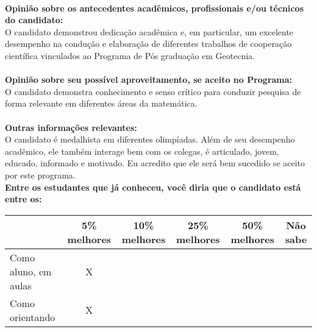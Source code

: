\documentclass[11pt]{article}
\begin{document}
\\
\textbf{Opinião sobre os antecedentes acadêmicos, profissionais e/ou técnicos do candidato:}
\\O candidato demonstrou dedicação acadêmica e, em particular, um excelente desempenho na condução e elaboração de diferentes trabalhos de cooperação científica vinculados ao Programa de Pós graduação em Geotecnia. \\
\\
\textbf{Opinião sobre seu possível aproveitamento, se aceito no Programa:}
\\O candidato demonstra conhecimento e senso crítico para conduzir pesquisa de forma relevante em diferentes áreas da matemática.\\ 
\\
\textbf{Outras informações relevantes:} \\O candidato é medalhista em diferentes olimpíadas. Além de seu desempenho acadêmico, ele também interage bem com os colegas, é articulado, jovem, educado, informado e motivado. Eu acredito que ele será bem sucedido se aceito por este programa.
\\[0.3cm]
\textbf{Entre os estudantes que já conheceu, você diria que o candidato está entre os:}
\\
\begin{tabular}{|l|c|c|c|c|c|}
\hline
 & 5\% melhores & 10\% melhores & 25\% melhores & 50\% melhores & Não sabe \\
\hline
Como aluno, em aulas & X &  &  &  & \\
\hline
Como orientando & X &  &  &  & \\
\hline
\end{tabular}
\end{document}
